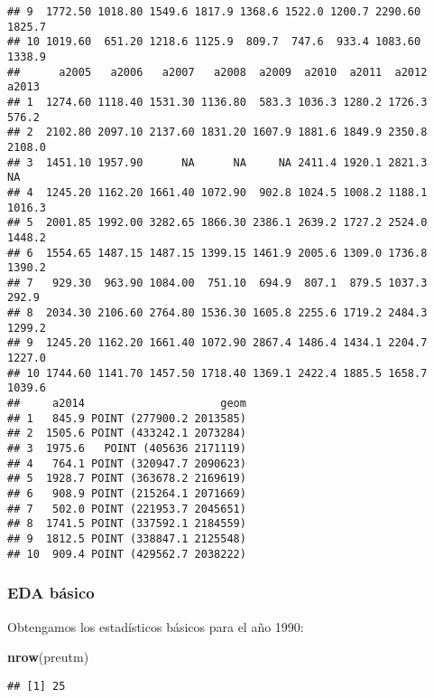 \documentclass[11pt,]{article}
\newenvironment{Shaded}{\begin{snugshade}}{\end{snugshade}}
\newcommand{\KeywordTok}[1]{\textcolor[rgb]{0.13,0.29,0.53}{\textbf{#1}}}
\newcommand{\OperatorTok}[1]{\textcolor[rgb]{0.81,0.36,0.00}{\textbf{#1}}}
\newcommand{\NormalTok}[1]{#1}
\begin{document}
\begin{verbatim}
## 9  1772.50 1018.80 1549.6 1817.9 1368.6 1522.0 1200.7 2290.60 1825.7
## 10 1019.60  651.20 1218.6 1125.9  809.7  747.6  933.4 1083.60 1338.9
##      a2005   a2006   a2007   a2008  a2009  a2010  a2011  a2012  a2013
## 1  1274.60 1118.40 1531.30 1136.80  583.3 1036.3 1280.2 1726.3  576.2
## 2  2102.80 2097.10 2137.60 1831.20 1607.9 1881.6 1849.9 2350.8 2108.0
## 3  1451.10 1957.90      NA      NA     NA 2411.4 1920.1 2821.3     NA
## 4  1245.20 1162.20 1661.40 1072.90  902.8 1024.5 1008.2 1188.1 1016.3
## 5  2001.85 1992.00 3282.65 1866.30 2386.1 2639.2 1727.2 2524.0 1448.2
## 6  1554.65 1487.15 1487.15 1399.15 1461.9 2005.6 1309.0 1736.8 1390.2
## 7   929.30  963.90 1084.00  751.10  694.9  807.1  879.5 1037.3  292.9
## 8  2034.30 2106.60 2764.80 1536.30 1605.8 2255.6 1719.2 2484.3 1299.2
## 9  1245.20 1162.20 1661.40 1072.90 2867.4 1486.4 1434.1 2204.7 1227.0
## 10 1744.60 1141.70 1457.50 1718.40 1369.1 2422.4 1885.5 1658.7 1039.6
##     a2014                     geom
## 1   845.9 POINT (277900.2 2013585)
## 2  1505.6 POINT (433242.1 2073284)
## 3  1975.6   POINT (405636 2171119)
## 4   764.1 POINT (320947.7 2090623)
## 5  1928.7 POINT (363678.2 2169619)
## 6   908.9 POINT (215264.1 2071669)
## 7   502.0 POINT (221953.7 2045651)
## 8  1741.5 POINT (337592.1 2184559)
## 9  1812.5 POINT (338847.1 2125548)
## 10  909.4 POINT (429562.7 2038222)
\end{verbatim}

\subsubsection{EDA básico}\label{eda-buxe1sico}

Obtengamos los estadísticos básicos para el año 1990:

\begin{Shaded}
\begin{Highlighting}[]
\KeywordTok{nrow}\NormalTok{(preutm)}
\end{Highlighting}
\end{Shaded}

\begin{verbatim}
## [1] 25
\end{verbatim}

\begin{Shaded}
\end{Shaded}
\end{document}
